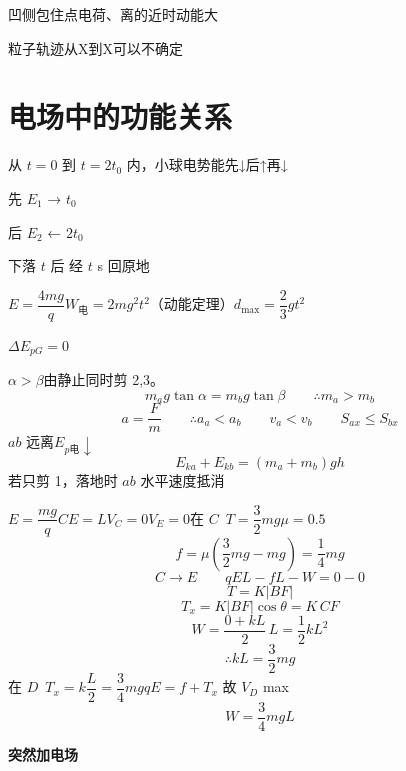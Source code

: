 凹侧包住点电荷、离的近时动能大


粒子轨迹从X到X可以不确定


\section{电场中的功能关系}

从 $t=0$ 到 $t=2t_0$ 内，小球电势能先↓后↑再↓

先 $E_1$ → $t_0$

后 $E_2$ ← $2t_0$

\begin{problem}
下落 $t$ 后 经 $t$ s 回原地
\begin{solution}
$E=\dfrac{4mg}{q}$\qquad $W_{\text{电}}=2mg^2t^2$（动能定理）\qquad $d_{\max}=\dfrac23gt^2$

$\Delta E_{pG}=0$
\end{solution}
\end{problem}

$\alpha>\beta$\quad 由静止同时剪 2,3。
\[
m_ag\tan\alpha=m_bg\tan\beta \qquad \therefore m_a>m_b %
\]
\[
a=\frac{F}{m}\qquad \therefore a_a<a_b\qquad v_a<v_b\qquad S_{ax}\le S_{bx}
\]
$ab$ 远离\quad $E_{p\text{电}}\downarrow$
\[
E_{ka}+E_{kb}=(m_a+m_b)gh
\]
若只剪 1，落地时 $ab$ 水平速度抵消

$E=\dfrac{mg}{q}$\qquad $CE=L$\qquad $V_C=0$\quad $V_E=0$\qquad 在 $C$\ $T=\dfrac32mg$\quad $\mu=0.5$
\[
f=\mu\left(\frac32mg-mg\right)=\frac14mg
\]
\[
C\to E\qquad qEL-fL-W=0-0
\]
\[
T=K|BF| %
\]
\[
T_x=K|BF|\cos\theta=K\,CF
\]
\[
W=\frac{0+kL}{2}\,L=\frac12kL^2
\]
\[
\therefore kL=\frac32mg
\]
在 $D$\ $T_x=k\dfrac{L}{2}=\dfrac34mg$\qquad $qE=f+T_x$ 故 $V_D$ max
\[
W=\frac34mgL
\]

\textbf{突然加电场}


